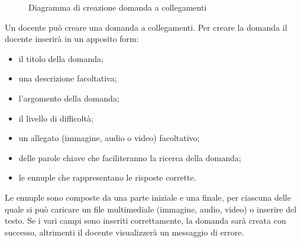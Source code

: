\documentclass[a4paper, titlepage]{article}
\begin{document}
\newpage
{}
\begin{figure}[H]
	\centering
	\noindent{}
	\caption{Diagramma di creazione domanda a collegamenti}
\end{figure}
Un docente può creare una domanda a collegamenti. Per creare la domanda il docente inserirà in un apposito form:
\begin{itemize} 
	\item il titolo della domanda;
	\item una descrizione facoltativa; 
	\item l'argomento della domanda;
	\item il livello di difficoltà;
	\item un allegato (immagine, audio o video) facoltativo;
	\item delle parole chiave che faciliteranno la ricerca della domanda;
	\item le ennuple che rappresentano le risposte corrette. 
\end{itemize}
Le ennuple sono composte da una parte iniziale e una finale, per ciascuna delle quale si può caricare un file multimediale (immagine, audio, video) o inserire del testo.
Se i vari campi sono inseriti correttamente, la domanda sarà creata con successo, altrimenti il docente visualizzerà un messaggio di errore.
\end{document}
